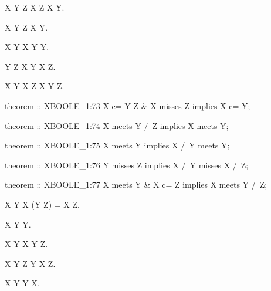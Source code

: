 \begin{paracol}{2}
\begin{theorem}
  X \subset Y \cup Z \land X \misses Z \implies X \subset Y.
\end{theorem}

\begin{theorem}
  X \meets Y \cap Z \implies X \meets Y.
\end{theorem}

\begin{theorem}
  X \meets Y \implies X \cap Y \meets Y.
\end{theorem}

\begin{theorem}
  Y \misses Z \implies X \cap Y \misses X \cap Z.
\end{theorem}

\begin{theorem}
  X \meets Y \land X \subset Z \implies X \meets Y \cap Z.
\end{theorem}

\switchcolumn

\begin{mizar}
theorem :: XBOOLE_1:73
  X c= Y \/ Z & X misses Z implies X c= Y;

theorem :: XBOOLE_1:74
  X meets Y /\ Z implies X meets Y;

theorem :: XBOOLE_1:75
  X meets Y implies X /\ Y meets Y;

theorem :: XBOOLE_1:76
  Y misses Z implies X /\ Y misses X /\ Z;

theorem :: XBOOLE_1:77
  X meets Y & X c= Z implies X meets Y /\ Z;
\end{mizar}

\switchcolumn*\ensurevspace{5cm}

\begin{theorem}
  X \misses Y \implies X \cap (Y \cup Z) = X \cap Z.
\end{theorem}

\begin{theorem}
  X \setminus Y \misses Y.
\end{theorem}

\begin{theorem}
  X \misses Y \implies X \misses Y \setminus Z.
\end{theorem}

\begin{theorem}
  X \misses Y \setminus Z \implies Y \misses X \setminus Z.
\end{theorem}

\begin{theorem}
  X \setminus Y \misses Y \setminus X.
\end{theorem}


\end{paracol}

